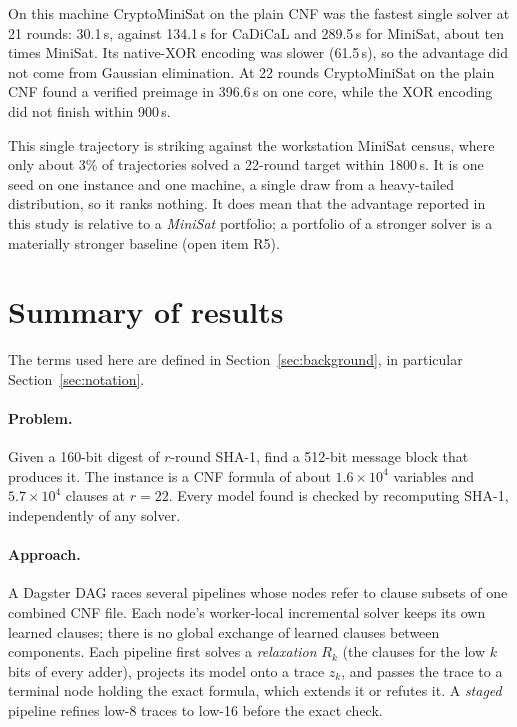 \documentclass[11pt,a4paper]{article}
\begin{document}
On this machine CryptoMiniSat on the plain CNF was the fastest single solver at 21 rounds: 30.1\,s,
against 134.1\,s for CaDiCaL and 289.5\,s for MiniSat, about ten times MiniSat. Its native-XOR
encoding was slower (61.5\,s), so the advantage did not come from Gaussian elimination. At 22 rounds
CryptoMiniSat on the plain CNF found a verified preimage in 396.6\,s on one core, while the XOR
encoding did not finish within 900\,s.

This single trajectory is striking against the workstation MiniSat census, where only about 3\% of
trajectories solved a 22-round target within 1800\,s. It is one seed on one instance and one machine,
a single draw from a heavy-tailed distribution, so it ranks nothing. It does mean that the advantage
reported in this study is relative to a \emph{MiniSat} portfolio; a portfolio of a stronger solver is
a materially stronger baseline (open item R5).

\section{Summary of results}
The terms used here are defined in Section~\ref{sec:background}, in particular
Section~\ref{sec:notation}.

\paragraph{Problem.} Given a 160-bit digest of $r$-round SHA-1, find a 512-bit message block that
produces it. The instance is a CNF formula of about $1.6\times10^4$ variables and
$5.7\times10^4$ clauses at $r=22$. Every model found is checked by recomputing SHA-1, independently
of any solver.

\paragraph{Approach.} A Dagster DAG races several pipelines whose nodes refer to clause subsets of
one combined CNF file. Each node's worker-local incremental solver keeps its own learned clauses;
there is no global exchange of learned clauses between components. Each
pipeline first solves a \emph{relaxation} $R_k$ (the clauses for the low $k$ bits of every adder),
projects its model onto a trace $z_k$, and passes the trace to a terminal node holding the exact
formula, which extends it or refutes it. A \emph{staged} pipeline refines low-8 traces to low-16
before the exact check.
\end{document}

